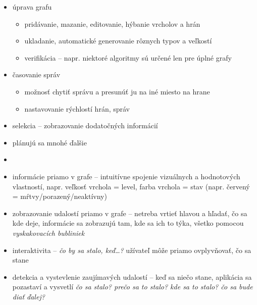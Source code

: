     

\begin{itemize}
    \item úprava grafu
    \begin{itemize}
        \item pridávanie, mazanie, editovanie, hýbanie vrcholov a hrán
        \item ukladanie, automatické generovanie rôznych typov a veľkostí
        \item verifikácia -- napr. niektoré algoritmy sú určené len pre úplné grafy
    \end{itemize}
    \item časovanie správ
    \begin{itemize}
        \item možnosť chytiť správu a presunúť ju na iné miesto na hrane
        \item nastavovanie rýchlostí hrán, správ
    \end{itemize}
    \item selekcia -- zobrazovanie dodatočných informácií
    \item plánujú sa mnohé ďalšie


\end{itemize}






\begin{itemize}

    \item 
    \item informácie priamo v grafe -- intuitívne spojenie vizuálnych a hodnotových
    vlastností, napr. veľkosť vrchola = level, farba vrchola = stav (napr. červený =
    mŕtvy/porazený/neaktívny)
    \item zobrazovanie udalostí priamo v grafe -- netreba vrtieť hlavou a hľadať, čo sa kde deje,
    informácie sa zobrazujú tam, kde sa ich to týka, všetko pomocou \emph{vyskakovacích bubliniek}
    \item interaktivita -- \emph{čo by sa stalo, keď\dots?} užívateľ môže priamo ovplyvňovať, čo sa
    stane
    \item detekcia a vystevlenie zaujímavých udalostí -- keď sa niečo stane, aplikácia sa pozastaví a vysvetlí
    \emph{čo sa stalo? prečo sa to stalo? kde sa to stalo? čo sa bude diať ďalej?}

\end{itemize}

